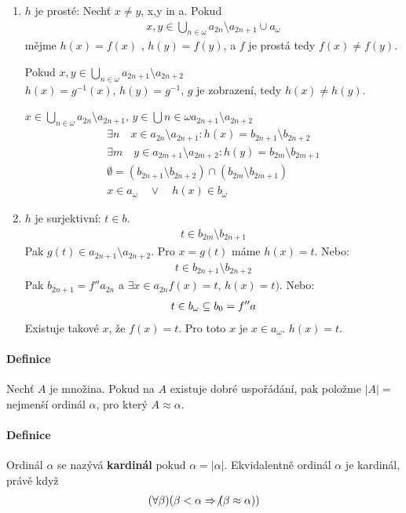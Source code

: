 \documentclass[a4paper,12pt,titlepage]{article}
\begin{document}
\begin{enumerate}

\item $h$ je prosté: Nechť $x\neq y$, x,y in a. Pokud 
\begin{align}
x, y \in \bigcup_{n\in\omega} a_{2n} \setminus a_{2n+1} \cup a_\omega
\end{align}
mějme $h(x) = f(x)$ , $h(y) = f(y)$, a $f$ je prostá tedy $f(x) \neq f(y)$.

Pokud $x,y \in \bigcup_{n\in\omega} a_{2n+1}\setminus a_{2n+2}$ \\
$h(x) = g^{-1}(x)$, $h(y) = g^{-1}$, $g$ je zobrazení, tedy $h(x) \neq h(y)$.

$x \in \bigcup_{n\in\omega} a_{2n} \setminus a_{2n+1}$, $y \in \bigcup{n\in\omega}
a_{2n+1} \setminus a_{2n+2}$
\begin{align}
	\exists n \quad x \in a_{2n} \setminus a_{2n+1}: h(x) = b_{2n+1} \setminus
		b_{2n+2} \\
	\exists m \quad y \in a_{2m+1} \setminus a_{2m+2}: h(y) = b_{2m} \setminus
		b_{2m+1} \\
	\emptyset = (b_{2n+1} \setminus b_{2n+2}) \cap (b_{2m} \setminus b_{2m+1})
	\\
	x \in a_\omega \quad\lor\quad h(x) \in b_\omega
\end{align}

\item $h$ je surjektivní: $t \in b$. \\
\begin{align}
	t \in b_{2m} \setminus b_{2n+1}
\end{align}
Pak $g(t) \in a_{2n+1} \setminus a_{2n+2}$. Pro $x = g(t)$ máme $h(x) = t$.
Nebo:
\begin{align}
	t \in b_{2n+1} \setminus b_{2n+2}
\end{align}
Pak $b_{2n+1} = f''a_{2n}$ a $\exists  x \in a_{2n} f(x) = t$, $h(x) = t)$.
Nebo:
\begin{align}
	t \in b_\omega \subseteq b_0 = f''a
\end{align}
Existuje takové $x$, že $f(x) = t$. Pro toto $x$ je $x \in a_\omega$. $h(x) = t$.
\end{enumerate}
\paragraph{Definice}
Nechť $A$ je množina. Pokud na $A$ existuje dobré uspořádání, pak položme $|A| =$
nejmenší ordinál $\alpha$, pro který $A \approx \alpha$.
\paragraph{Definice}
Ordinál $\alpha$ se nazývá \textbf{kardinál} pokud $\alpha = |\alpha|$.
Ekvidalentně ordinál $\alpha$ je kardinál, právě když 
\begin{align}
	(\forall \beta)(\beta < \alpha \Rightarrow \not (\beta \approx \alpha))
\end{align}
\end{document}

